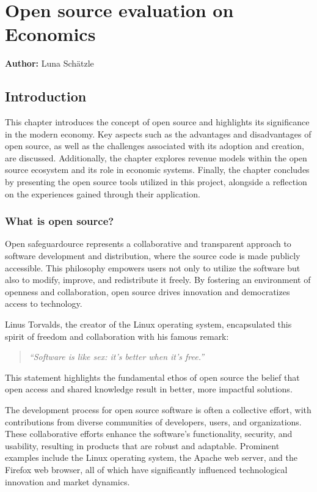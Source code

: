 \chapter{Open source evaluation on Economics}
\label{cha:Open_source_evaluation_Economics}
\textbf{Author:} Luna Schätzle

\section{Introduction}

This chapter introduces the concept of open source and highlights its significance in the modern economy. 
Key aspects such as the advantages and disadvantages of open source, as well as the challenges associated with its adoption and creation, are discussed. 
Additionally, the chapter explores revenue models within the open source ecosystem and its role in economic systems. 
Finally, the chapter concludes by presenting the open source tools utilized in this project, alongside a reflection on the experiences gained through their application.


\subsection{What is open source?}

Open safeguardource represents a collaborative and transparent approach to software development and distribution, 
where the source code is made publicly accessible. This philosophy empowers users not only to utilize the software but also to modify, 
improve, and redistribute it freely. By fostering an environment of openness and collaboration, 
open source drives innovation and democratizes access to technology.

Linus Torvalds, the creator of the Linux operating system, encapsulated this spirit of freedom and collaboration with his famous remark:

\begin{quote}
    \textit{“Software is like sex: it's better when it's free.”}
    \author{Linus Torvalds}
\end{quote}

\cite{LinusTorvaldsquoteopensource}

This statement highlights the fundamental ethos of open source the belief that open access and shared knowledge result in better, more impactful solutions.


The development process for open source software is often a collective effort, 
with contributions from diverse communities of developers, users, and organizations. 
These collaborative efforts enhance the software's functionality, security, and usability, 
resulting in products that are robust and adaptable. Prominent examples include the Linux operating system, 
the Apache web server, and the Firefox web browser, all of which have significantly influenced technological innovation and market dynamics.

